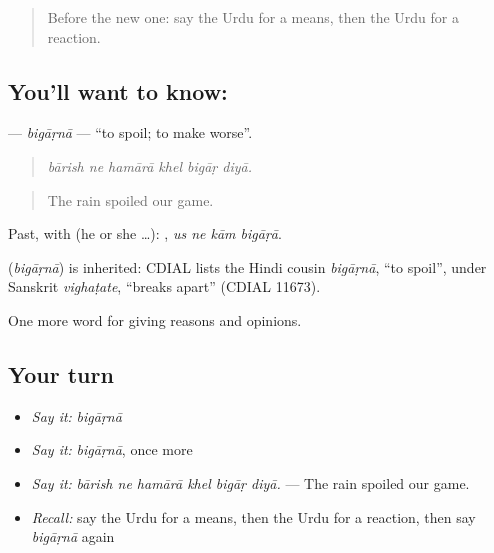 \label{lesson:UR-C332-bigarna}



\begin{quote}
Before the new one: say the Urdu for a means, then the Urdu for a reaction.
\end{quote}

\subsection*{You'll want to know: }
\textbf{} — \emph{bigāṛnā} — \textquotedblleft{}to spoil; to make worse\textquotedblright{}.

\begin{quote}
     
\end{quote}

\begin{quote}
\emph{bārish ne hamārā khel bigāṛ diyā.}
\end{quote}

\begin{quote}
The rain spoiled our game.
\end{quote}

Past, with  (he or she …):    , \emph{us ne kām bigāṛā}.

\begin{cousinweb}
\textbf{} (\emph{bigāṛnā}) is inherited: CDIAL lists the Hindi cousin \emph{bigāṛnā}, \textquotedblleft{}to spoil\textquotedblright{}, under Sanskrit \emph{vighaṭate}, \textquotedblleft{}breaks apart\textquotedblright{} (CDIAL 11673).
\end{cousinweb}

\begin{grammarlens}[title={What you've built}]
One more word for giving reasons and opinions.
\end{grammarlens}

\subsection*{Your turn}
\begin{itemize}
\raggedright
  \item \emph{Say it:} \emph{bigāṛnā}
  \item \emph{Say it:} \emph{bigāṛnā}, once more
  \item \emph{Say it:} \emph{bārish ne hamārā khel bigāṛ diyā.} — The rain spoiled our game.
  \item \emph{Recall:} say the Urdu for a means, then the Urdu for a reaction, then say \emph{bigāṛnā} again
\end{itemize}

